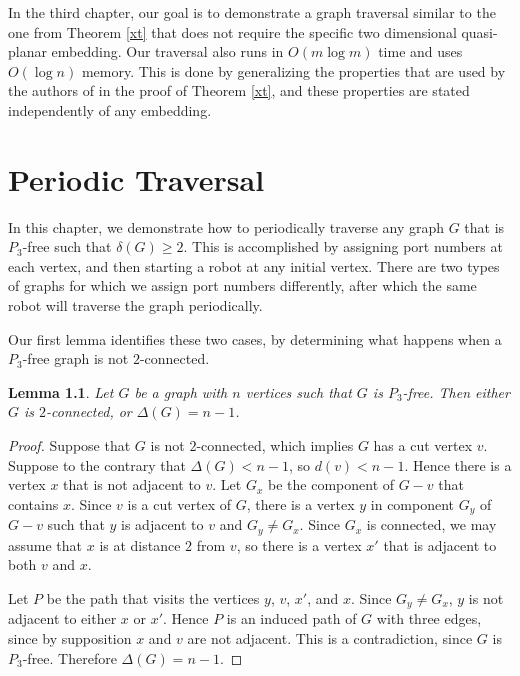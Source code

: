 \documentclass[12pt,letterpaper,oneside]{book}
\newtheorem{lemma}[theorem]{Lemma}
\begin{document}
In the third chapter, our goal is to demonstrate a graph traversal 
similar to the one from Theorem \ref{xt} that does not require the specific two dimensional quasi-planar embedding.  Our traversal 
also runs in $O(m\log m)$ time and uses $O(\log n)$ memory.  
This is done by generalizing the properties that are used by the authors of \cite{CDKOSU} in the proof of Theorem \ref{xt}, and 
these properties are stated independently of any embedding.  


\chapter{Periodic Traversal}



In this chapter, we 
demonstrate how to periodically traverse any graph $G$ that is $P_3$-free such that $\delta(G)\ge 2$.  This is accomplished by assigning 
port numbers at each vertex, and then starting a robot at any initial vertex.  There are two types of graphs for which we assign port numbers 
differently, after which the same robot will traverse the graph periodically.  


Our first lemma identifies these two cases, by determining 
what happens when a $P_3$-free graph is not $2$-connected.  

\begin{lemma}\label{lemclass}
Let $G$ be a graph with $n$ vertices such that $G$ is $P_3$-free.  Then either $G$ is $2$-connected, or 
$\Delta(G)=n-1$.
\end{lemma}
\begin{proof}
Suppose that $G$ is not $2$-connected, which implies $G$ has a cut vertex $v$.  Suppose to the contrary that $\Delta(G)<n-1$, so 
$d(v)< n-1$.  Hence there is a vertex $x$ that is not adjacent to $v$.  Let $G_x$ be the component of $G-v$ that contains $x$.  Since 
$v$ is a cut vertex of $G$, there is a vertex $y$ in component $G_y$ of $G-v$ such that $y$ is adjacent to $v$ and $G_y\ne G_x$.  
Since $G_x$ is connected, we may assume that $x$ is at distance $2$ from $v$, so 
there is a vertex $x'$ that is adjacent to both $v$ and $x$.  

Let $P$ be the path that visits 
the vertices $y$, $v$, $x'$, and $x$.  Since $G_y\ne G_x$, $y$ is not adjacent to either $x$ or $x'$.  Hence $P$ is an induced 
path of $G$ with three edges, since by supposition $x$ and $v$ are not adjacent.  This is a contradiction, since $G$ is $P_3$-free.  
Therefore $\Delta(G)=n-1$.  
\end{proof}
\end{document}
